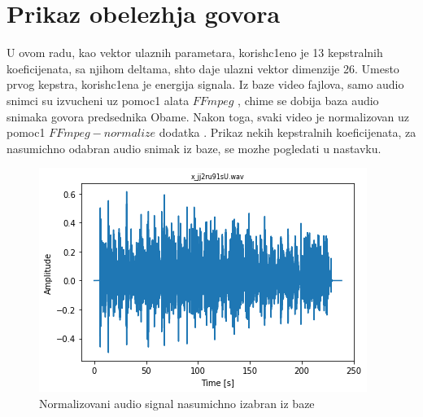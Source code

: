 \documentclass[a4paper, openany, oneside, 11pt]{book}
\begin{document}
\section{Prikaz obelezhja govora}
U ovom radu, kao vektor ulaznih parametara, korish\-c1eno je 13 kepstralnih koeficijenata, sa njihom deltama, shto daje ulazni vektor dimenzije 26. Umesto prvog kepstra, korish\-c1ena je energija signala. Iz baze video fajlova, samo audio snimci su izvucheni uz pomoc1 alata $FFmpeg$ \cite{FFmpeg}, chime se dobija baza audio snimaka govora predsednika Obame. Nakon toga, svaki video je normalizovan uz pomoc1 $FFmpeg-normalize$ dodatka \cite{FFmpegN}. Prikaz nekih kepstralnih koeficijenata, za nasumichno odabran audio snimak iz baze, se mozhe pogledati u nastavku.
\begin{figure}[h!]
\centering
  \includegraphics[scale=0.5]{res/audio_sig.png}
  \caption{Normalizovani audio signal nasumichno izabran iz baze}
  \label{fig:3}
  \vspace{0pt}
\end{figure}
\end{document}

